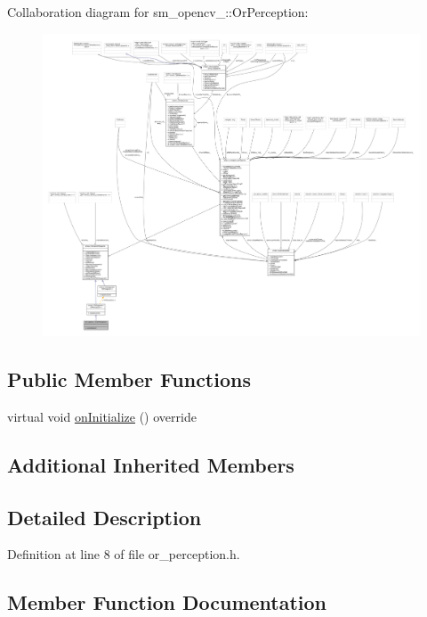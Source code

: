 Collaboration diagram for sm\+\_\+opencv\+\_\+:\+:Or\+Perception\+:
\nopagebreak
\begin{figure}[H]
\begin{center}
\leavevmode
\includegraphics[width=350pt]{classsm__opencv__2_1_1OrPerception__coll__graph}
\end{center}
\end{figure}
\subsection*{Public Member Functions}
\begin{DoxyCompactItemize}
\item 
virtual void \hyperlink{classsm__opencv__2_1_1OrPerception_a9ab8361b8548db88d8b380ec1d986b7d}{on\+Initialize} () override
\end{DoxyCompactItemize}
\subsection*{Additional Inherited Members}


\subsection{Detailed Description}


Definition at line 8 of file or\+\_\+perception.\+h.



\subsection{Member Function Documentation}
\mbox{\label{classsm__opencv__2_1_1OrPerception_a9ab8361b8548db88d8b380ec1d986b7d}} 
